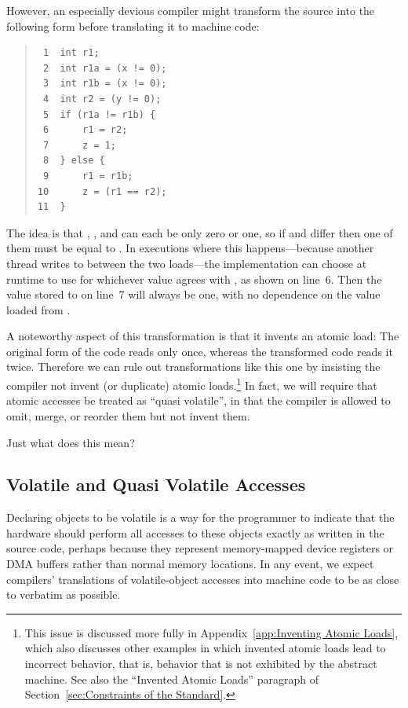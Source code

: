 \documentclass[10]{article}
\begin{document}
However, an especially devious compiler might transform the source into
the following form before translating it to machine code:
\begin{quote}
\begin{verbatim}
 1  int r1;
 2  int r1a = (x != 0);
 3  int r1b = (x != 0);
 4  int r2 = (y != 0);
 5  if (r1a != r1b) {
 6      r1 = r2;
 7      z = 1;
 8  } else {
 9      r1 = r1b;
10      z = (r1 == r2);
11  }
\end{verbatim}
\end{quote}
The idea is that , , and  can each be only zero or one,
so if  and  differ then one of them must be equal to .
In executions where this happens---because another thread writes to 
between the two loads---the implementation can choose at runtime to use
for  whichever value agrees with , as shown on line~6.
Then the value stored to  on line~7 will always be one,
with no dependence on the value loaded from .

A noteworthy aspect of this transformation is that it invents an atomic load:
The original form of the code reads  only once,
whereas the transformed code reads it twice.
Therefore we can rule out transformations like this one by insisting
the compiler not invent (or duplicate) atomic loads.\footnote{
	This issue is discussed more fully in
	Appendix~\ref{app:Inventing Atomic Loads},
	which also discusses other examples in which invented atomic
	loads lead to incorrect behavior, that is, behavior that is not
	exhibited by the abstract machine.
	See also the ``Invented Atomic Loads'' paragraph of
        Section~\ref{sec:Constraints of the Standard}.}
In fact, we will require that atomic accesses be treated as
``quasi volatile'', in that the compiler is allowed to omit,
merge, or reorder them but not invent them.

Just what does this mean?

\subsection{Volatile and Quasi Volatile Accesses}
\label{sec:Volatile and Quasi Volatile Accesses}

Declaring objects to be volatile is a way for the programmer to
indicate that the hardware should perform all accesses to these
objects exactly as written in the source code, perhaps because they
represent memory-mapped device registers or DMA buffers rather than
normal memory locations.
In any event, we expect compilers' translations of volatile-object accesses
into machine code to be as close to verbatim as possible.
\end{document}
